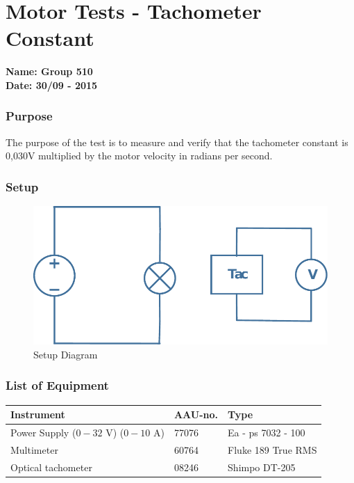 \pagebreak
\section{Motor Tests - Tachometer Constant} %
\textbf{Name: Group 510}\\
\textbf{Date: 30/09 - 2015}

\subsubsection{Purpose}
The purpose of the test is to measure and verify that the tachometer constant is 0,030\si{V} multiplied by the motor velocity in radians per second.

\subsubsection{Setup}
\begin{figure}[H]
  \centering
	\includegraphics[scale=0.5]{figures/MotorTest3.pdf}
	\caption{Setup Diagram}
	\flushleft
\end{figure}

\subsubsection{List of Equipment}

\begin{table}[H]
\begin{tabular}{|l|l|p{4cm}|}
\hline%
  \textbf{Instrument}                    &  \textbf{AAU-no.}  &  \textbf{Type}       \\
\hline%
  Power Supply ($0 - 32$ V) ($0 - 10$ A) &  77076             &  Ea - ps 7032 - 100  \\
\hline%
  Multimeter                             &  60764             &  Fluke 189 True RMS  \\
\hline%
  Optical tachometer                     &  08246             &  Shimpo DT-205       \\
\hline%
\end{tabular}
\end{table}


